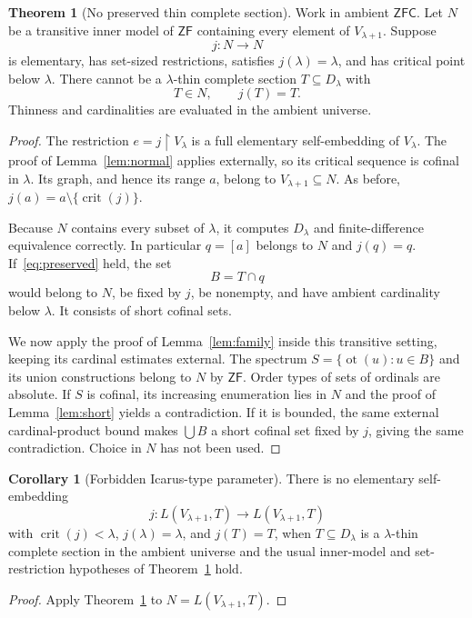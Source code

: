 \documentclass[11pt,letterpaper]{article}
\theoremstyle{definition}
\newtheorem{theorem}[definition]{Theorem}
\newtheorem{corollary}[definition]{Corollary}
\numberwithin{equation}{section}
\newcommand{\ZFC}{\mathsf{ZFC}}
\newcommand{\ZF}{\mathsf{ZF}}
\newcommand{\crit}{\operatorname{crit}}
\newcommand{\ot}{\operatorname{ot}}
\newcommand{\restr}{\mathbin{\upharpoonright}}
\newcommand{\D}{D_\lambda}
\begin{document}
\begin{theorem}[No preserved thin complete section]\label{thm:icarus}
Work in ambient $\ZFC$. Let $N$ be a transitive inner model of $\ZF$ containing every element of $V_{\lambda+1}$. Suppose
\[
j:N\longrightarrow N
\]
is elementary, has set-sized restrictions, satisfies $j(\lambda)=\lambda$, and has critical point below $\lambda$. There cannot be a $\lambda$-thin complete section $T\subseteq\D$ with
\begin{equation}
T\in N,\qquad j(T)=T.
\label{eq:preserved}
\end{equation}
Thinness and cardinalities are evaluated in the ambient universe.
\end{theorem}
\begin{proof}
The restriction $e=j\restr V_\lambda$ is a full elementary self-embedding of $V_\lambda$. The proof of Lemma~\ref{lem:normal} applies externally, so its critical sequence is cofinal in $\lambda$. Its graph, and hence its range $a$, belong to $V_{\lambda+1}\subseteq N$. As before, $j(a)=a\setminus\{\crit(j)\}$.

Because $N$ contains every subset of $\lambda$, it computes $\D$ and finite-difference equivalence correctly. In particular $q=[a]$ belongs to $N$ and $j(q)=q$. If~\eqref{eq:preserved} held, the set
\[
B=T\cap q
\]
would belong to $N$, be fixed by $j$, be nonempty, and have ambient cardinality below $\lambda$. It consists of short cofinal sets.

We now apply the proof of Lemma~\ref{lem:family} inside this transitive setting, keeping its cardinal estimates external. The spectrum $S=\{\ot(u):u\in B\}$ and its union constructions belong to $N$ by $\ZF$. Order types of sets of ordinals are absolute. If $S$ is cofinal, its increasing enumeration lies in $N$ and the proof of Lemma~\ref{lem:short} yields a contradiction. If it is bounded, the same external cardinal-product bound makes $\bigcup B$ a short cofinal set fixed by $j$, giving the same contradiction. Choice in $N$ has not been used.
\end{proof}

\begin{corollary}[Forbidden Icarus-type parameter]\label{cor:icarus}
There is no elementary self-embedding
\[
j:L(V_{\lambda+1},T)\longrightarrow L(V_{\lambda+1},T)
\]
with $\crit(j)<\lambda$, $j(\lambda)=\lambda$, and $j(T)=T$, when $T\subseteq\D$ is a $\lambda$-thin complete section in the ambient universe and the usual inner-model and set-restriction hypotheses of Theorem~\ref{thm:icarus} hold.
\end{corollary}
\begin{proof}
Apply Theorem~\ref{thm:icarus} to $N=L(V_{\lambda+1},T)$.
\end{proof}
\end{document}
